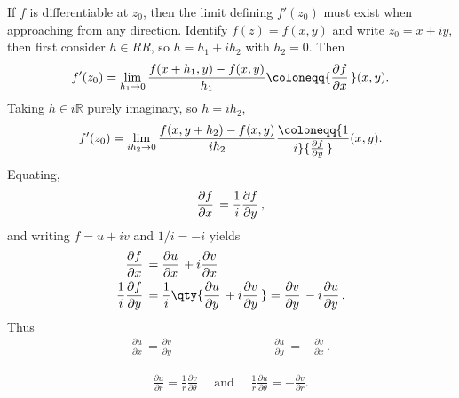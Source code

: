 \begin{proposition}

If \(f\) is differentiable at \(z_0\), then the limit defining
\(f'(z_0)\) must exist when approaching from any direction. Identify
\(f(z) = f(x, y)\) and write \(z_0 = x+ iy\), then first consider
\(h\in RR\), so \(h = h_1 + ih_2\) with \(h_2 = 0\). Then
\begin{align*}
f'(z_0) = 
\lim_{h_1\to 0} { f(x+h_1, y) - f(x, y) \over h_1}
\coloneqq{\frac{\partial f}{\partial x}\,}(x, y)
.\end{align*}
Taking \(h \in i{\mathbb{R}}\) purely imaginary, so \(h= ih_2\),
\begin{align*}
f'(z_0)
= \lim_{ih_2\to 0} { f(x, y+h_2) - f(x, y) \over ih_2 } \coloneqq{1\over i} {\frac{\partial f}{\partial y}\,}(x, y)
.\end{align*}
Equating,
\begin{align*}
{\frac{\partial f}{\partial x}\,} = {1\over i} {\frac{\partial f}{\partial y}\,}
,\end{align*}
and writing \(f = u + iv\) and \(1/i = -i\) yields
\begin{align*}
{\frac{\partial f}{\partial x}\,} &= {\frac{\partial u}{\partial x}\,} + i {\frac{\partial v}{\partial x}\,} \\
{1\over i} {\frac{\partial f}{\partial y}\,} &= {1\over i} \qty{ {\frac{\partial u}{\partial y}\,} + i {\frac{\partial v}{\partial y}\,}} = {\frac{\partial v}{\partial y}\,} - i{\frac{\partial u}{\partial y}\,} 
.\end{align*}
Thus
\begin{align*}
{\frac{\partial u}{\partial x}\,} = {\frac{\partial v}{\partial y}\,} \hspace{8em} {\frac{\partial u}{\partial y}\,} = -{\frac{\partial v}{\partial x}\,}
.\end{align*}

\end{proposition}

\begin{proposition}

\begin{align*}  
\frac{\partial u}{\partial r}=\frac{1}{r} \frac{\partial v}{\partial \theta} \quad \text { and } \quad \frac{1}{r} \frac{\partial u}{\partial \theta}=-\frac{\partial v}{\partial r}
.\end{align*}

\end{proposition}

